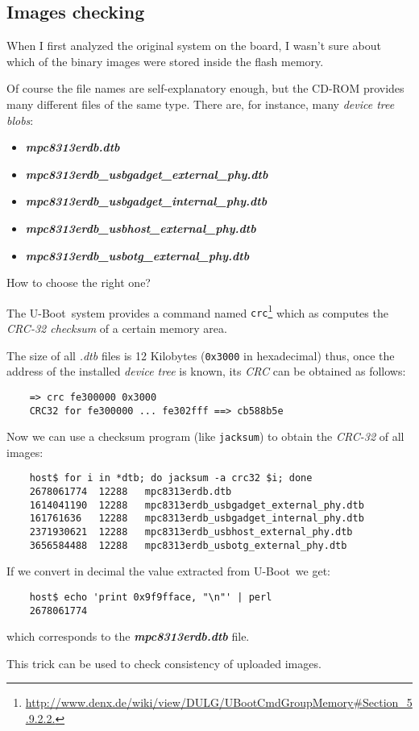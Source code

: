 \documentclass[10pt,a4paper]{article}
\newcommand{\FileName}[1]{\textbf{\textsl{\textsf{{#1}}}}}
\newcommand{\Const}[1]{{{\tt {#1}}}}
\newcommand{\TechName}[1]{\textsf{{#1}}}
\newcommand{\StdName}[1]{\emph{{#1}}}
\newcommand{\Command}[1]{{\tt {#1}}}
\newcommand{\uBoot}{\TechName{U-Boot}}
\begin{document}
        \subsection{ Images checking }

            When I first analyzed the original system on the board, I
            wasn't sure about which of the binary images were stored
            inside the flash memory.

            Of course the file names are self-explanatory enough, but the
            CD-ROM provides many different files of the same type. There
            are, for instance, many \emph{device tree blobs}:
            \begin{itemize}
                \item \FileName{mpc8313erdb.dtb}
                \item \FileName{mpc8313erdb\_usbgadget\_external\_phy.dtb}
                \item \FileName{mpc8313erdb\_usbgadget\_internal\_phy.dtb}
                \item \FileName{mpc8313erdb\_usbhost\_external\_phy.dtb}
                \item \FileName{mpc8313erdb\_usbotg\_external\_phy.dtb}
            \end{itemize}
            How to choose the right one?

            The \uBoot\ system provides a command named
            \Command{crc}\footnote{
                \url{http://www.denx.de/wiki/view/DULG/UBootCmdGroupMemory\#Section\_5.9.2.2.}
            }
            which as computes the \StdName{CRC-32 checksum} of a certain
            memory area.

            The size of all \emph{.dtb} files is 12 Kilobytes
            (\Const{0x3000} in hexadecimal) thus, once
            the address of the installed \emph{device tree} is known, its
            \StdName{CRC} can be obtained as follows:
\begin{lstlisting}
    => crc fe300000 0x3000
    CRC32 for fe300000 ... fe302fff ==> cb588b5e
\end{lstlisting}

            Now we can use a checksum program (like \Command{jacksum}) to
            obtain the \StdName{CRC-32} of all images:
\begin{lstlisting}
    host$ for i in *dtb; do jacksum -a crc32 $i; done
    2678061774	12288	mpc8313erdb.dtb
    1614041190	12288	mpc8313erdb_usbgadget_external_phy.dtb
    161761636	12288	mpc8313erdb_usbgadget_internal_phy.dtb
    2371930621	12288	mpc8313erdb_usbhost_external_phy.dtb
    3656584488	12288	mpc8313erdb_usbotg_external_phy.dtb
\end{lstlisting}
            If we convert in decimal the value extracted from \uBoot\ we
            get:
\begin{lstlisting}
    host$ echo 'print 0x9f9fface, "\n"' | perl
    2678061774
\end{lstlisting}
            which corresponds to the \FileName{mpc8313erdb.dtb} file.

            This trick can be used to check consistency of uploaded
            images.
\end{document}
